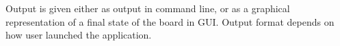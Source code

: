 % 
% 
% 
% 
% 
% 

Output is given either as output in command line, or as a graphical representation of a final state
of the board in GUI. Output format depends on how user launched the application.
